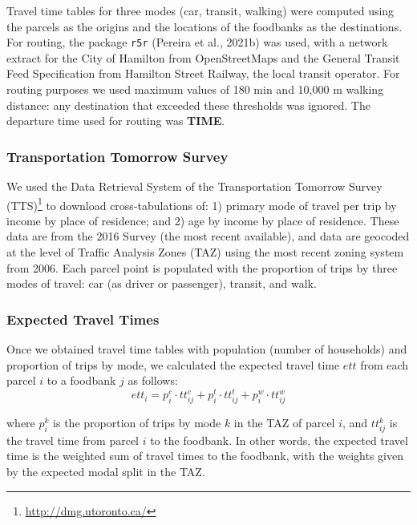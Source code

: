 \documentclass[]{elsarticle} %
\begin{document}
Travel time tables for three modes (car, transit, walking) were computed
using the parcels as the origins and the locations of the foodbanks as
the destinations. For routing, the package \texttt{r5r} (Pereira et al.,
2021b) was used, with a network extract for the City of Hamilton from
OpenStreetMaps and the General Transit Feed Specification from Hamilton
Street Railway, the local transit operator. For routing purposes we used
maximum values of 180 min and 10,000 m walking distance: any destination
that exceeded these thresholds was ignored. The departure time used for
routing was \textbf{TIME}.

\hypertarget{transportation-tomorrow-survey}{%
\subsubsection{Transportation Tomorrow
Survey}\label{transportation-tomorrow-survey}}

We used the Data Retrieval System of the Transportation Tomorrow Survey
(TTS)\footnote{\url{http://dmg.utoronto.ca/}} to download
cross-tabulations of: 1) primary mode of travel per trip by income by
place of residence; and 2) age by income by place of residence. These
data are from the 2016 Survey (the most recent available), and data are
geocoded at the level of Traffic Analysis Zones (TAZ) using the most
recent zoning system from 2006. Each parcel point is populated with the
proportion of trips by three modes of travel: car (as driver or
passenger), transit, and walk.

\hypertarget{expected-travel-times}{%
\subsubsection{Expected Travel Times}\label{expected-travel-times}}

Once we obtained travel time tables with population (number of
households) and proportion of trips by mode, we calculated the expected
travel time \(ett\) from each parcel \(i\) to a foodbank \(j\) as
follows: \[
ett_i = p^c_i\cdot tt^c_{ij} + p^t_i\cdot tt^t_{ij} + p^w_i\cdot tt^w_{ij}
\]

\noindent where \(p^k_i\) is the proportion of trips by mode \(k\) in
the TAZ of parcel \(i\), and \(tt^k_{ij}\) is the travel time from
parcel \(i\) to the foodbank. In other words, the expected travel time
is the weighted sum of travel times to the foodbank, with the weights
given by the expected modal split in the TAZ.
\end{document}
